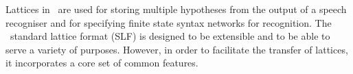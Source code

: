 %



Lattices in \HTK\ are used for storing multiple
hypotheses from the output of a speech
recogniser and for specifying finite state syntax networks for
recognition.  The \HTK\ standard lattice format (SLF) is designed to
be extensible and to be able to serve a variety of purposes.  However,
in order to facilitate the transfer of lattices, it
incorporates a core set of common features.

